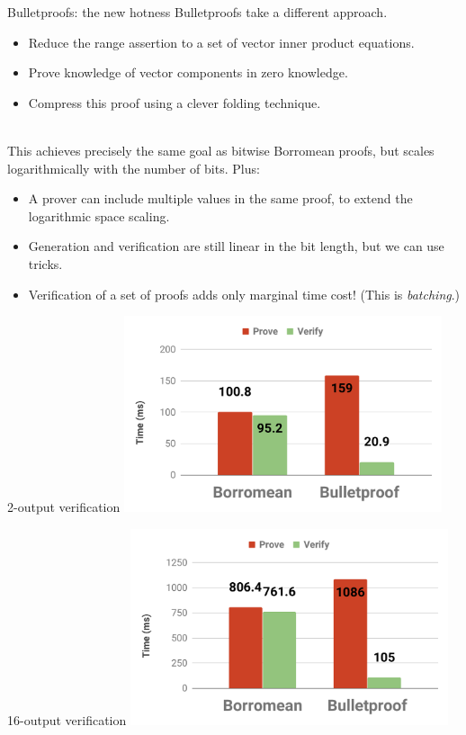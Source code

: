 \documentclass[aspectratio=169]{beamer}
\begin{document}
\begin{frame}{Bulletproofs: the new hotness}
Bulletproofs take a different approach.
\begin{itemize}
\item Reduce the range assertion to a set of vector inner product equations.
\item Prove knowledge of vector components in zero knowledge.
\item Compress this proof using a clever folding technique. \\~\\
\end{itemize}

This achieves precisely the same goal as bitwise Borromean proofs, but scales logarithmically with the number of bits. Plus:
\begin{itemize}
\item A prover can include multiple values in the same proof, to extend the logarithmic space scaling.
\item Generation and verification are still linear in the bit length, but we can use tricks.
\item Verification of a set of proofs adds only marginal time cost! (This is \textit{batching}.)
\end{itemize}
\end{frame}


\begin{frame}{2-output verification}
\centering
\includegraphics[width=0.7\textwidth]{bp-2.pdf}
\end{frame}


\begin{frame}{16-output verification}
\centering
\includegraphics[width=0.7\textwidth]{bp-16.pdf}
\end{frame}
\end{document}
